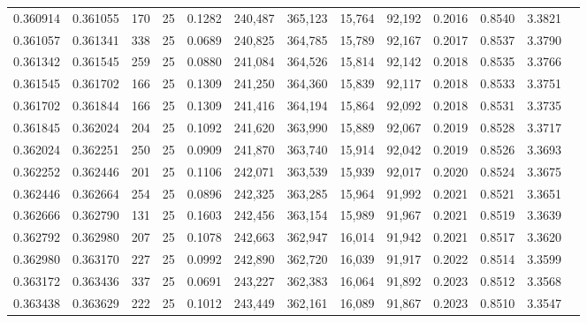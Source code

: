 \begin{tabular}{rrrrrrrrrrrrr}
0.360914 & 0.361055 &   170 &  25 &                                     0.1282 & 240,487 & 365,123 &  15,764 &  92,192 & 0.2016 & 0.8540 & 3.3821 \\
0.361057 & 0.361341 &   338 &  25 &                                     0.0689 & 240,825 & 364,785 &  15,789 &  92,167 & 0.2017 & 0.8537 & 3.3790 \\
0.361342 & 0.361545 &   259 &  25 &                                     0.0880 & 241,084 & 364,526 &  15,814 &  92,142 & 0.2018 & 0.8535 & 3.3766 \\
0.361545 & 0.361702 &   166 &  25 &                                     0.1309 & 241,250 & 364,360 &  15,839 &  92,117 & 0.2018 & 0.8533 & 3.3751 \\
0.361702 & 0.361844 &   166 &  25 &                                     0.1309 & 241,416 & 364,194 &  15,864 &  92,092 & 0.2018 & 0.8531 & 3.3735 \\
0.361845 & 0.362024 &   204 &  25 &                                     0.1092 & 241,620 & 363,990 &  15,889 &  92,067 & 0.2019 & 0.8528 & 3.3717 \\
0.362024 & 0.362251 &   250 &  25 &                                     0.0909 & 241,870 & 363,740 &  15,914 &  92,042 & 0.2019 & 0.8526 & 3.3693 \\
0.362252 & 0.362446 &   201 &  25 &                                     0.1106 & 242,071 & 363,539 &  15,939 &  92,017 & 0.2020 & 0.8524 & 3.3675 \\
0.362446 & 0.362664 &   254 &  25 &                                     0.0896 & 242,325 & 363,285 &  15,964 &  91,992 & 0.2021 & 0.8521 & 3.3651 \\
0.362666 & 0.362790 &   131 &  25 &                                     0.1603 & 242,456 & 363,154 &  15,989 &  91,967 & 0.2021 & 0.8519 & 3.3639 \\
0.362792 & 0.362980 &   207 &  25 &                                     0.1078 & 242,663 & 362,947 &  16,014 &  91,942 & 0.2021 & 0.8517 & 3.3620 \\
0.362980 & 0.363170 &   227 &  25 &                                     0.0992 & 242,890 & 362,720 &  16,039 &  91,917 & 0.2022 & 0.8514 & 3.3599 \\
0.363172 & 0.363436 &   337 &  25 &                                     0.0691 & 243,227 & 362,383 &  16,064 &  91,892 & 0.2023 & 0.8512 & 3.3568 \\
0.363438 & 0.363629 &   222 &  25 &                                     0.1012 & 243,449 & 362,161 &  16,089 &  91,867 & 0.2023 & 0.8510 & 3.3547 \\

\end{tabular}
